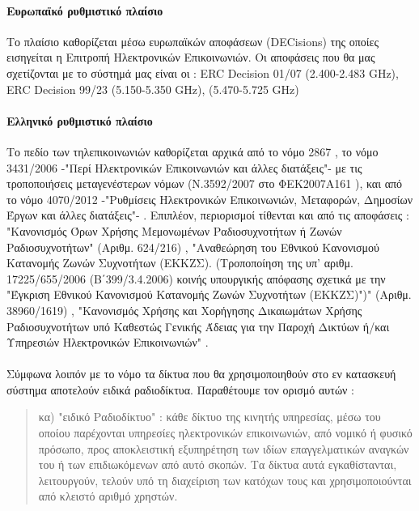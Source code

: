 \documentclass[a4paper, 12pt, twoside]{report}
\begin{document}
{{{{{{			\paragraph{Ευρωπαϊκό ρυθμιστικό πλαίσιο}{Το πλαίσιο καθορίζεται μέσω ευρωπαϊκών αποφάσεων (DECisions) της οποίες εισηγείται η Επιτροπή Ηλεκτρονικών Επικοινωνιών. Οι αποφάσεις που θα μας σχετίζονται με το σύστημά μας είναι οι : ERC Decision 01/07 (2.400-2.483 GHz), ERC Decision 99/23 (5.150-5.350 GHz), (5.470-5.725 GHz)

			}
			
			\paragraph{Ελληνικό ρυθμιστικό πλαίσιο}{Το πεδίο των  τηλεπικοινωνιών καθορίζεται αρχικά από το νόμο 2867 \cite{ΦΕΚ2000A273}, το νόμο 3431/2006 -"Περί Ηλεκτρονικών Επικοινωνιών και άλλες διατάξεις"- \cite{ΦΕΚ2006A13} με τις τροποποιήσεις μεταγενέστερων νόμων (Ν.3592/2007 στο ΦΕΚ2007Α161 \cite{ΦΕΚ2007Α161}), και από το νόμο 4070/2012 -"Ρυθμίσεις Ηλεκτρονικών Επικοινωνιών, Μεταφορών, Δημοσίων Έργων και άλλες διατάξεις"- \cite{ΦΕΚ2012Α82}. Επιπλέον, περιορισμοί τίθενται και από τις αποφάσεις : "Κανονισμός Όρων Χρήσης Μεμονωμένων Ραδιοσυχνοτήτων ή Ζωνών Ραδιοσυχνοτήτων" (Αριθμ. 624/216) \cite{ΦΕΚ2011Β2512}, "Αναθεώρηση του Εθνικού Κανονισμού Κατανομής Ζωνών Συχνοτήτων (ΕΚΚΖΣ). (Τροποποίηση της υπ’ αριθμ. 17225/655/2006 (Β΄399/3.4.2006) κοινής υπουργικής απόφασης σχετικά με την "Έγκριση Εθνικού Κανονισμού Κατανομής Ζωνών Συχνοτήτων (ΕΚΚΖΣ)")" (Αριθμ. 38960/1619) \cite{ΦΕΚ2008Β1979}, "Κανονισμός Χρήσης και Χορήγησης Δικαιωμάτων Χρήσης Ραδιοσυχνοτήτων υπό Καθεστώς Γενικής Άδειας για την Παροχή Δικτύων ή/και Υπηρεσιών Ηλεκτρονικών Επικοινωνιών" \cite{ΦΕΚ2006Β750}.
			}
			
			\paragraph{}{Σύμφωνα λοιπόν με το νόμο \cite[Κεφάλαιο Α, Άρθρο 2 Ορισμοί]{ΦΕΚ2006A13} τα δίκτυα που θα χρησιμοποιηθούν στο εν κατασκευή σύστημα αποτελούν ειδικά ραδιοδίκτυα. Παραθέτουμε τον ορισμό αυτών :
			\begin{quote}
				κα) "ειδικό Ραδιοδίκτυο" : κάθε δίκτυο της κινητής υπηρεσίας, μέσω του οποίου παρέχονται υπηρεσίες ηλεκτρονικών επικοινωνιών, από νομικό ή φυσικό πρόσωπο, προς αποκλειστική εξυπηρέτηση των ιδίων επαγγελματικών αναγκών του ή των επιδιωκόμενων από αυτό σκοπών. Τα δίκτυα αυτά εγκαθίστανται, λειτουργούν, τελούν υπό τη διαχείριση των κατόχων τους και χρησιμοποιούνται από κλειστό αριθμό χρηστών.
			\end{quote}
			
}}}}}}}
\end{document}
